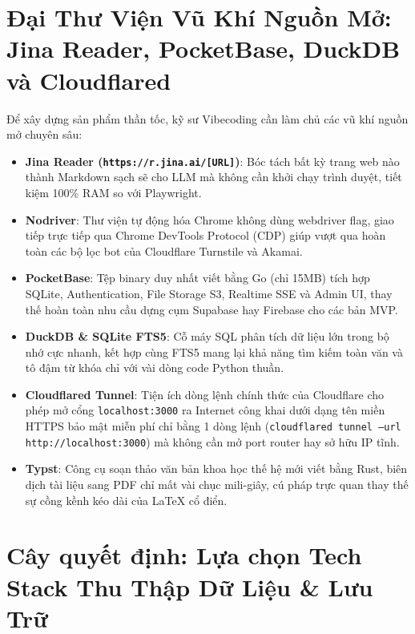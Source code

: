 \documentclass[a4paper,11pt]{report}
\begin{document}
\section{Đại Thư Viện Vũ Khí Nguồn Mở: Jina Reader, PocketBase, DuckDB và Cloudflared}
Để xây dựng sản phẩm thần tốc, kỹ sư Vibecoding cần làm chủ các vũ khí nguồn mở chuyên sâu:
\begin{itemize}[leftmargin=1.5em]
    \item \textbf{Jina Reader (\texttt{https://r.jina.ai/[URL]})}: Bóc tách bất kỳ trang web nào thành Markdown sạch sẽ cho LLM mà không cần khởi chạy trình duyệt, tiết kiệm 100\% RAM so với Playwright.
    \item \textbf{Nodriver}: Thư viện tự động hóa Chrome không dùng webdriver flag, giao tiếp trực tiếp qua Chrome DevTools Protocol (CDP) giúp vượt qua hoàn toàn các bộ lọc bot của Cloudflare Turnstile và Akamai.
    \item \textbf{PocketBase}: Tệp binary duy nhất viết bằng Go (chỉ 15MB) tích hợp SQLite, Authentication, File Storage S3, Realtime SSE và Admin UI, thay thế hoàn toàn nhu cầu dựng cụm Supabase hay Firebase cho các bản MVP.
    \item \textbf{DuckDB \& SQLite FTS5}: Cỗ máy SQL phân tích dữ liệu lớn trong bộ nhớ cực nhanh, kết hợp cùng FTS5 mang lại khả năng tìm kiếm toàn văn và tô đậm từ khóa chỉ với vài dòng code Python thuần.
    \item \textbf{Cloudflared Tunnel}: Tiện ích dòng lệnh chính thức của Cloudflare cho phép mở cổng \texttt{localhost:3000} ra Internet công khai dưới dạng tên miền HTTPS bảo mật miễn phí chỉ bằng 1 dòng lệnh (\texttt{cloudflared tunnel --url http://localhost:3000}) mà không cần mở port router hay sở hữu IP tĩnh.
    \item \textbf{Typst}: Công cụ soạn thảo văn bản khoa học thế hệ mới viết bằng Rust, biên dịch tài liệu sang PDF chỉ mất vài chục mili-giây, cú pháp trực quan thay thế sự cồng kềnh kéo dài của LaTeX cổ điển.
\end{itemize}

\section{Cây quyết định: Lựa chọn Tech Stack Thu Thập Dữ Liệu \& Lưu Trữ}
\end{document}
